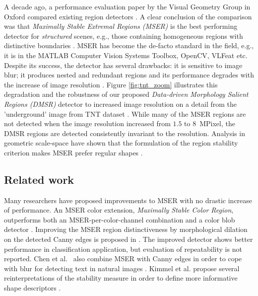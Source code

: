 \documentclass[conference,compsoc]{IEEEtran}
\begin{document}
A decade ago, a performance evaluation paper by the Visual Geometry Group in Oxford compared existing region detectors \cite{Mikolajczyk:2005}. 
A clear conclusion of the comparison was that {\em  Maximally Stable Extremal Regions (MSER)} is the best performing detector for {\em structured} scenes, e.g., those containing homogeneous regions with distinctive boundaries \cite{Matas2002BMVC}. MSER has become the de-facto standard in the field, e.g., it is in the MATLAB Computer Vision Systems Toolbox, OpenCV, VLFeat etc. Despite its success, the detector has several drawbacks: it is sensitive to image blur; it produces nested and redundant regions and its performance degrades with the increase of image resolution \cite{CorRos2013}. Figure \ref{fig:tnt_zoom} illustrates this degradation and the robustness of our proposed {\em Data-driven Morphology Salient Regions (DMSR)} detector to increased image resolution on a detail from the 'underground' image from TNT dataset \cite{CorRos2013}. While many of the MSER regions are not detected when the image resolution increased from $1.5$ to $8$~MPixel, the DMSR regions are detected consistently invariant to the resolution. Analysis in geometric scale-space have shown that the formulation of the region stability criterion makes MSER prefer regular shapes \cite{Kimmel11}.

\subsection{Related work}
Many researchers have proposed improvements to MSER with no drastic increase of performance. An MSER color extension, {\em Maximally Stable Color Region}, outperforms both an MSER-per-color-channel combination and a color blob detector \cite{Forssen07}. Improving the MSER region distinctiveness by morphological dilation on the detected Canny edges is proposed in \cite{Wang14}. The improved detector shows better performance in classification application, but evaluation of repeatability is not reported. 
Chen et al.~ also combine MSER with Canny edges in order to cope with blur for detecting text in natural images \cite{Chen11}.
Kimmel et al. %
propose several reinterpretations of the stability measure in order to define more informative shape descriptors \cite{Kimmel11}. 
\end{document}
